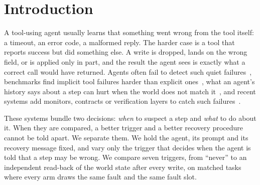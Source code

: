 \section{Introduction}\label{sec:intro}
A tool-using agent usually learns that something went wrong from the tool itself: a timeout, an
error code, a malformed reply. The harder case is a tool that reports success but did something
else. A write is dropped, lands on the wrong field, or is applied only in part, and the result the
agent sees is exactly what a correct call would have returned. Agents often fail to detect such quiet
failures~\cite{kraishan2026loud}, benchmarks find implicit tool failures harder than explicit
ones~\cite{zhu2026tools}, what an agent's history says about a step can hurt when the world does not
match it~\cite{pakhomov2026cleaning}, and recent systems add monitors, contracts or verification layers
to catch such failures~\cite{panthi2026outcome,babu2026selfhealing,dip2026invariantaware,kaynar2026tools}.

These systems bundle two decisions: \emph{when} to suspect a step and \emph{what} to do about it.
When they are compared, a better trigger and a better recovery procedure cannot be told apart. We
separate them. We hold the agent, its prompt and its recovery message fixed, and vary only the trigger
that decides when the agent is told that a step may be wrong. We compare seven triggers, from
``never'' to an independent read-back of the world state after every write, on matched tasks where
every arm draws the same fault and the same fault slot.

